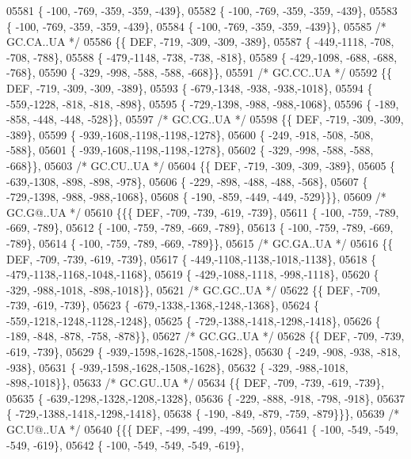 \begin{DoxyCode}
05581 \{ -100, -769, -359, -359, -439\},
05582 \{ -100, -769, -359, -359, -439\},
05583 \{ -100, -769, -359, -359, -439\},
05584 \{ -100, -769, -359, -359, -439\}\},
05585 \textcolor{comment}{/* GC.CA..UA */}
05586 \{\{  DEF, -719, -309, -309, -389\},
05587 \{ -449,-1118, -708, -708, -788\},
05588 \{ -479,-1148, -738, -738, -818\},
05589 \{ -429,-1098, -688, -688, -768\},
05590 \{ -329, -998, -588, -588, -668\}\},
05591 \textcolor{comment}{/* GC.CC..UA */}
05592 \{\{  DEF, -719, -309, -309, -389\},
05593 \{ -679,-1348, -938, -938,-1018\},
05594 \{ -559,-1228, -818, -818, -898\},
05595 \{ -729,-1398, -988, -988,-1068\},
05596 \{ -189, -858, -448, -448, -528\}\},
05597 \textcolor{comment}{/* GC.CG..UA */}
05598 \{\{  DEF, -719, -309, -309, -389\},
05599 \{ -939,-1608,-1198,-1198,-1278\},
05600 \{ -249, -918, -508, -508, -588\},
05601 \{ -939,-1608,-1198,-1198,-1278\},
05602 \{ -329, -998, -588, -588, -668\}\},
05603 \textcolor{comment}{/* GC.CU..UA */}
05604 \{\{  DEF, -719, -309, -309, -389\},
05605 \{ -639,-1308, -898, -898, -978\},
05606 \{ -229, -898, -488, -488, -568\},
05607 \{ -729,-1398, -988, -988,-1068\},
05608 \{ -190, -859, -449, -449, -529\}\}\},
05609 \textcolor{comment}{/* GC.G@..UA */}
05610 \{\{\{  DEF, -709, -739, -619, -739\},
05611 \{ -100, -759, -789, -669, -789\},
05612 \{ -100, -759, -789, -669, -789\},
05613 \{ -100, -759, -789, -669, -789\},
05614 \{ -100, -759, -789, -669, -789\}\},
05615 \textcolor{comment}{/* GC.GA..UA */}
05616 \{\{  DEF, -709, -739, -619, -739\},
05617 \{ -449,-1108,-1138,-1018,-1138\},
05618 \{ -479,-1138,-1168,-1048,-1168\},
05619 \{ -429,-1088,-1118, -998,-1118\},
05620 \{ -329, -988,-1018, -898,-1018\}\},
05621 \textcolor{comment}{/* GC.GC..UA */}
05622 \{\{  DEF, -709, -739, -619, -739\},
05623 \{ -679,-1338,-1368,-1248,-1368\},
05624 \{ -559,-1218,-1248,-1128,-1248\},
05625 \{ -729,-1388,-1418,-1298,-1418\},
05626 \{ -189, -848, -878, -758, -878\}\},
05627 \textcolor{comment}{/* GC.GG..UA */}
05628 \{\{  DEF, -709, -739, -619, -739\},
05629 \{ -939,-1598,-1628,-1508,-1628\},
05630 \{ -249, -908, -938, -818, -938\},
05631 \{ -939,-1598,-1628,-1508,-1628\},
05632 \{ -329, -988,-1018, -898,-1018\}\},
05633 \textcolor{comment}{/* GC.GU..UA */}
05634 \{\{  DEF, -709, -739, -619, -739\},
05635 \{ -639,-1298,-1328,-1208,-1328\},
05636 \{ -229, -888, -918, -798, -918\},
05637 \{ -729,-1388,-1418,-1298,-1418\},
05638 \{ -190, -849, -879, -759, -879\}\}\},
05639 \textcolor{comment}{/* GC.U@..UA */}
05640 \{\{\{  DEF, -499, -499, -499, -569\},
05641 \{ -100, -549, -549, -549, -619\},
05642 \{ -100, -549, -549, -549, -619\},

\end{DoxyCode}
